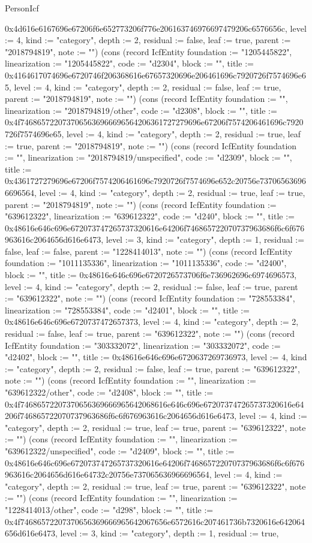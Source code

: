 \begin{lexlean}{PersonIcf}
\begin{semanticmodule}
{0x4d616e6167696e67206f6e652773206f776e206163746976697479206c6576656c, level := 4, kind := "category", depth := 2, residual := false, leaf := true, parent := "2018794819", note := ""}) (cons (record IcfEntity {foundation := "1205445822", linearization := "1205445822", code := "d2304", block := "", title := 0x4164617074696e6720746f206368616e67657320696e206461696c7920726f7574696e65, level := 4, kind := "category", depth := 2, residual := false, leaf := true, parent := "2018794819", note := ""}) (cons (record IcfEntity {foundation := "", linearization := "2018794819/other", code := "d2308", block := "", title := 0x4f7468657220737065636966696564206361727279696e67206f7574206461696c7920726f7574696e65, level := 4, kind := "category", depth := 2, residual := true, leaf := true, parent := "2018794819", note := ""}) (cons (record IcfEntity {foundation := "", linearization := "2018794819/unspecified", code := "d2309", block := "", title := 0x4361727279696e67206f7574206461696c7920726f7574696e652c20756e737065636966696564, level := 4, kind := "category", depth := 2, residual := true, leaf := true, parent := "2018794819", note := ""}) (cons (record IcfEntity {foundation := "639612322", linearization := "639612322", code := "d240", block := "", title := 0x48616e646c696e672073747265737320616e64206f746865722070737963686f6c6f676963616c2064656d616e6473, level := 3, kind := "category", depth := 1, residual := false, leaf := false, parent := "1228414013", note := ""}) (cons (record IcfEntity {foundation := "1011135336", linearization := "1011135336", code := "d2400", block := "", title := 0x48616e646c696e6720726573706f6e736962696c6974696573, level := 4, kind := "category", depth := 2, residual := false, leaf := true, parent := "639612322", note := ""}) (cons (record IcfEntity {foundation := "728553384", linearization := "728553384", code := "d2401", block := "", title := 0x48616e646c696e6720737472657373, level := 4, kind := "category", depth := 2, residual := false, leaf := true, parent := "639612322", note := ""}) (cons (record IcfEntity {foundation := "303332072", linearization := "303332072", code := "d2402", block := "", title := 0x48616e646c696e6720637269736973, level := 4, kind := "category", depth := 2, residual := false, leaf := true, parent := "639612322", note := ""}) (cons (record IcfEntity {foundation := "", linearization := "639612322/other", code := "d2408", block := "", title := 0x4f74686572207370656369666965642068616e646c696e672073747265737320616e64206f746865722070737963686f6c6f676963616c2064656d616e6473, level := 4, kind := "category", depth := 2, residual := true, leaf := true, parent := "639612322", note := ""}) (cons (record IcfEntity {foundation := "", linearization := "639612322/unspecified", code := "d2409", block := "", title := 0x48616e646c696e672073747265737320616e64206f746865722070737963686f6c6f676963616c2064656d616e64732c20756e737065636966696564, level := 4, kind := "category", depth := 2, residual := true, leaf := true, parent := "639612322", note := ""}) (cons (record IcfEntity {foundation := "", linearization := "1228414013/other", code := "d298", block := "", title := 0x4f74686572207370656369666965642067656e6572616c207461736b7320616e642064656d616e6473, level := 3, kind := "category", depth := 1, residual := true, }
\end{semanticmodule}
\end{lexlean}
